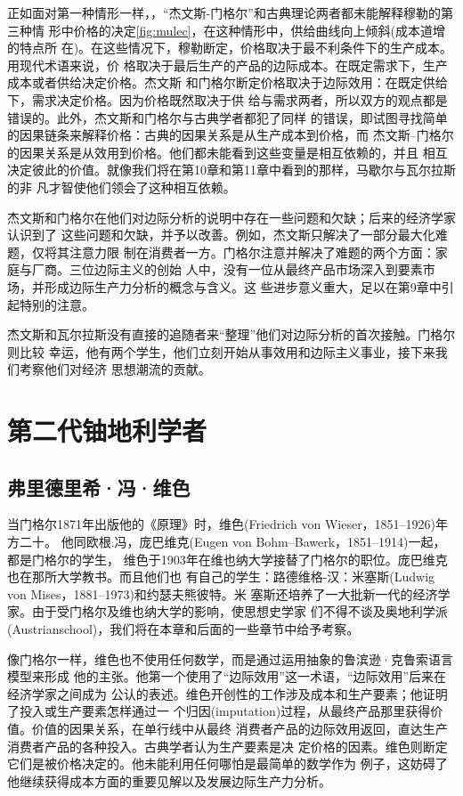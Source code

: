 正如面对第一种情形一样，，“杰文斯-门格尔”和古典理论两者都未能解释穆勒的第三种情
形中价格的决定\cref{fig:mulec}，在这种情形中，供给曲线向上倾斜(成本道增的特点所
在)。在这些情况下，穆勒断定，价格取决于最不利条件下的生产成本。用现代术语来说，价
格取决于最后生产的产品的边际成本。在既定需求下，生产成本或者供给决定价格。杰文斯
和门格尔断定价格取决于边际效用：在既定供给下，需求决定价格。因为价格既然取决于供
给与需求两者，所以双方的观点都是错误的。此外，杰文斯和门格尔与古典学者都犯了同样
的错误，即试图寻找简单的因果链条来解释价格：古典的因果关系是从生产成本到价格，而
杰文斯--门格尔的因果关系是从效用到价格。他们都未能看到这些变量是相互依赖的，并且
相互决定彼此的价值。就像我们将在第10章和第11章中看到的那样，马歇尔与瓦尔拉斯的非
凡才智使他们领会了这种相互依赖。

杰文斯和门格尔在他们对边际分析的说明中存在一些问题和欠缺；后来的经济学家认识到了
这些问题和欠缺，并予以改善。例如，杰文斯只解决了一部分最大化难题，仅将其注意力限
制在消费者一方。门格尔注意并解决了难题的两个方面：家庭与厂商。三位边际主义的创始
人中，没有一位从最终产品市场深入到要素市场，并形成边际生产力分析的概念与含义。这
些进步意义重大，足以在第9章中引起特别的注意。

杰文斯和瓦尔拉斯没有直接的追随者来“整理”他们对边际分析的首次接触。门格尔则比较
幸运，他有两个学生，他们立刻开始从事效用和边际主义事业，接下来我们考察他们对经济
思想潮流的贡献。

\section{第二代铀地利学者}

\subsection{弗里德里希·冯·维色}

当门格尔1871年出版他的《原理》时，维色(Friedrich von Wieser，1851--1926)年方二十。
他同欧根.冯，庞巴维克(Eugen von Bohm--Bawerk，1851--1914)一起，都是门格尔的学生，
维色于1903年在维也纳大学接替了门格尔的职位。庞巴维克也在那所大学教书。而且他们也
有自己的学生：路德维格-汉：米塞斯(Ludwig von Mises，1881--1973)和约瑟夫熊彼特。米
塞斯还培养了一大批新一代的经济学家。由于受门格尔及维也纳大学的影响，使思想史学家
们不得不谈及奥地利学派(Austrianschool)，我们将在本章和后面的一些章节中给予考察。

像门格尔一样，维色也不使用任何数学，而是通过运用抽象的鲁滨逊·克鲁索语言模型来形成
他的主张。他第一个使用了“边际效用”这一术语，“边际效用”后来在经济学家之间成为
公认的表述。维色开创性的工作涉及成本和生产要素；他证明了投入或生产要素怎样通过一
个归因(imputation)过程，从最终产品那里获得价值。价值的因果关系，在单行线中从最终
消费者产品的边际效用返回，直达生产消费者产品的各种投入。古典学者认为生产要素是决
定价格的因素。维色则断定它们是被价格决定的。他未能利用任何哪怕是最简单的数学作为
例子，这妨碍了他继续获得成本方面的重要见解以及发展边际生产力分析。

